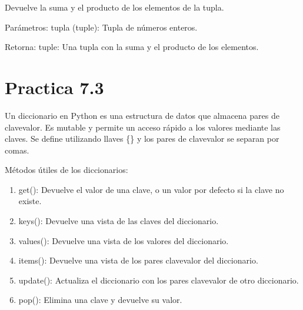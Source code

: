 \documentclass[letterpaper,10pt,spanish]{sphinxmanual}
\begin{document}

\begin{fulllineitems}
\label{\detokenize{pr7:pr7.2.suma_y_producto}}
\pysigstartsignatures
{}
\pysigstopsignatures
\sphinxAtStartPar
Devuelve la suma y el producto de los elementos de la tupla.

\sphinxAtStartPar
Parámetros:
tupla (tuple): Tupla de números enteros.

\sphinxAtStartPar
Retorna:
tuple: Una tupla con la suma y el producto de los elementos.

\end{fulllineitems}



\section{Practica 7.3}
\label{\detokenize{pr7:module-pr7.3}}\label{\detokenize{pr7:practica-7-3}}
\sphinxAtStartPar
Un diccionario en Python es una estructura de datos que almacena pares de clave\sphinxhyphen{}valor.
Es mutable y permite un acceso rápido a los valores mediante las claves.
Se define utilizando llaves \{\} y los pares de clave\sphinxhyphen{}valor se separan por comas.

\sphinxAtStartPar
Métodos útiles de los diccionarios:
\begin{enumerate}
%
\item {} 
\sphinxAtStartPar
get(): Devuelve el valor de una clave, o un valor por defecto si la clave no existe.

\item {} 
\sphinxAtStartPar
keys(): Devuelve una vista de las claves del diccionario.

\item {} 
\sphinxAtStartPar
values(): Devuelve una vista de los valores del diccionario.

\item {} 
\sphinxAtStartPar
items(): Devuelve una vista de los pares clave\sphinxhyphen{}valor del diccionario.

\item {} 
\sphinxAtStartPar
update(): Actualiza el diccionario con los pares clave\sphinxhyphen{}valor de otro diccionario.

\item {} 
\sphinxAtStartPar
pop(): Elimina una clave y devuelve su valor.

\end{enumerate}
\end{document}
